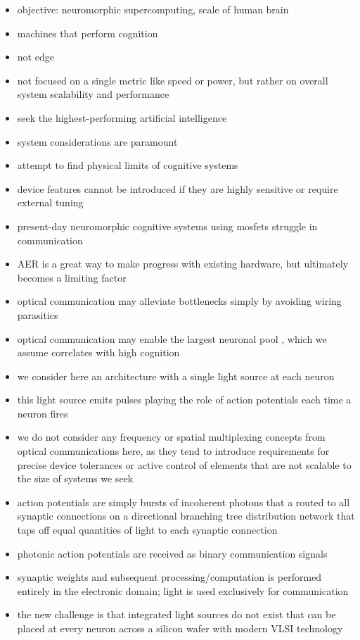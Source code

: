 \documentclass[onecolumn]{article}
\begin{document}
\begin{itemize}
\item objective: neuromorphic supercomputing, scale of human brain
\item machines that perform cognition
\item not edge
\item not focused on a single metric like speed or power, but rather on overall system scalability and performance
\item seek the highest-performing artificial intelligence
\item system considerations are paramount
\item attempt to find physical limits of cognitive systems
\item device features cannot be introduced if they are highly sensitive or require external tuning
\item present-day neuromorphic cognitive systems using mosfets struggle in communication
\item AER is a great way to make progress with existing hardware, but ultimately becomes a limiting factor
\item optical communication may alleviate bottlenecks simply by avoiding wiring parasitics
\item optical communication may enable the largest neuronal pool \cite{sh2018_ICRC}, which we assume correlates with high cognition
\item we consider here an architecture with a single light source at each neuron
\item this light source emits pulses playing the role of action potentials each time a neuron fires
\item we do not consider any frequency or spatial multiplexing concepts from optical communications here, as they tend to introduce requirements for precise device tolerances or active control of elements that are not scalable to the size of systems we seek
\item action potentials are simply bursts of incoherent photons that a routed to all synaptic connections on a directional branching tree distribution network that taps off equal quantities of light to each synaptic connection
\item photonic action potentials are received as binary communication signals
\item synaptic weights and subsequent processing/computation is performed entirely in the electronic domain; light is used exclusively for communication
\item the new challenge is that integrated light sources do not exist that can be placed at every neuron across a silicon wafer with modern VLSI technology

\end{itemize}
\end{document}
